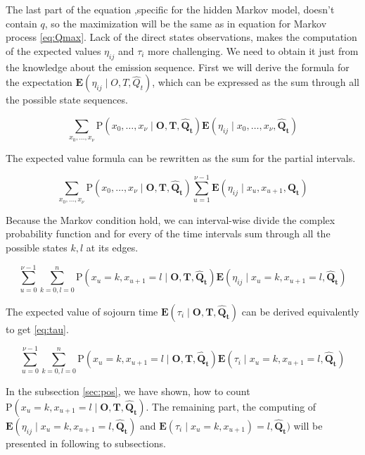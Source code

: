 \documentclass[thesis=M,english]{FITthesis}[2012/10/20]
\newcommand{\matr}[1]{\mathbf{#1}}
\begin{document}
The last part of the equation ,specific for the hidden Markov model, doesn't contain $q$, so the maximization will be the same as in equation for Markov process \eqref{eq:Qmax}. Lack of the direct states observations, makes the computation of the expected values $\eta_{ij}$ and $\tau_i$ more challenging. We need to obtain it just from the knowledge about the emission sequence. First we will derive the formula for the expectation $\mathbf{E}(\eta_{ij} \mid O,T, \hat Q_t )$, which can be expressed as the sum through all the possible state sequences.

\begin{equation} 
\sum_{x_0,\dots,x_\nu} \mathrm{P}(x_0,\dots,x_\nu \mid \matr{O},\matr{T}, \matr{ \hat Q_t }) \mathbf{E}(\eta_{ij} \mid x_0,\dots,x_\nu , \matr{\hat Q_t} )
\end{equation}

The expected value formula can be rewritten as the sum for the partial intervals.  

\begin{equation}
 \sum_{x_0,\dots,x_\nu} \mathrm{P}(x_0,\dots,x_\nu \mid \matr{O},\matr{T}, \matr{ \hat Q_t }) \sum_{u=1}^{\nu-1}\mathbf{E}(\eta_{ij} \mid x_u, x_{u+1} ,\matr{\hat Q_t} )
\end{equation}

Because the Markov condition hold, we can interval-wise divide the complex probability function and for every of the time intervals sum through all the possible states $k,l$ at its edges. 

\begin{equation}
\sum_{u=0}^{\nu-1} \sum_{k=0,l=0}^n \mathrm{P}( x_u = k, x_{u+1} = l \mid \matr{O},\matr{T}, \matr{ \hat Q_t }) \mathbf{E}(\eta_{ij} \mid x_u = k, x_{u+1} = l, \matr{ \hat Q_t } )
\end{equation}

The expected value of sojourn time $\mathbf{E}( \tau_i \mid \matr{O},\matr{T}, \matr{ \hat Q_t } )$ can be derived equivalently to get \eqref{eq:tau}.

\begin{equation}\label{eq:tau}
\sum_{u=0}^{\nu-1} \sum_{k=0,l=0}^n \mathrm{P}( x_u = k, x_{u+1} = l \mid \matr{O},\matr{T}, \matr{ \hat Q_t }) \mathbf{E}(\tau_i \mid x_u = k, x_{u+1} = l,\matr{\hat Q_t} )
\end{equation}

In the subsection \ref{sec:pos}, we have shown, how to count $\mathrm{P}(x_u = k,x_{u+1} = l \mid \matr{O},\matr{T}, \matr{ \hat Q_t })$. The remaining part, the computing of $\mathbf{E}(\eta_{ij} \mid x_u = k, x_{u+1} = l,\matr{\hat Q_t} )$ and $\mathbf{E}(\tau_i \mid x_u = k, x_{u+1}) = l, \matr{ \hat Q_t } )$ will be presented in following to subsections. 
\end{document}
